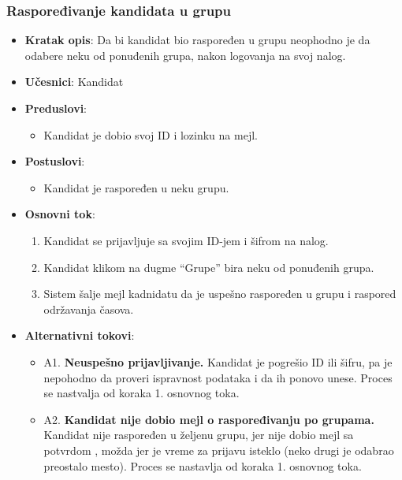 \subsubsection{Raspoređivanje kandidata u grupu}
\label{subsubsec:grupe}
\begin{itemize}
  \item \textbf{Kratak opis}: Da bi kandidat bio raspoređen u grupu neophodno je da odabere neku od ponuđenih grupa, nakon logovanja na svoj nalog. 
  \item \textbf{Učesnici}: Kandidat
  \item \textbf{Preduslovi}:
    \begin{itemize}
    \item Kandidat je dobio svoj ID i lozinku na mejl.
    \end{itemize}
  \item \textbf{Postuslovi}:
      \begin{itemize}
      \item Kandidat je raspoređen u neku grupu.
      \end{itemize}
  \item \textbf{Osnovni tok}:
      \begin{enumerate}
        \item Kandidat se prijavljuje sa svojim ID-jem i šifrom na nalog.
        \item Kandidat klikom na dugme “Grupe” bira neku od ponuđenih grupa.
        \item Sistem šalje mejl kadnidatu da je uspešno raspoređen u grupu i raspored održavanja časova.
      \end{enumerate}

  \item \textbf{Alternativni tokovi}:
      \begin{itemize}
        \item A1. \textbf{Neuspešno prijavljivanje.}
        Kandidat je pogrešio ID ili šifru, pa je nepohodno da proveri ispravnost podataka i da ih ponovo unese. Proces se nastvalja od koraka 1. osnovnog toka.
        \item A2. \textbf{Kandidat nije dobio mejl o raspoređivanju po grupama.}
        Kandidat nije raspoređen u željenu grupu, jer nije dobio mejl sa potvrdom , možda jer je vreme za prijavu isteklo (neko drugi je odabrao preostalo mesto). Proces se nastavlja od koraka 1. osnovnog toka.
      \end{itemize}
\end{itemize}